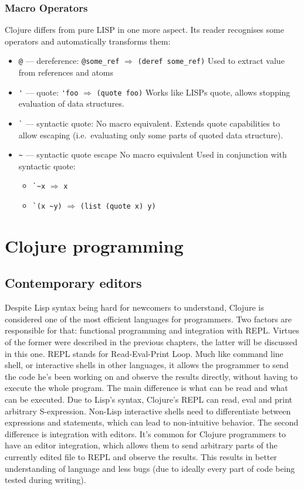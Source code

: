 \documentclass[11pt]{scrartcl}
\begin{document}
\subsubsection{Macro Operators}
Clojure differs from pure LISP in one more aspect.
Its reader recognises some operators and automatically transforms them:
\begin{itemize}
  \item \lstinline|@| --- dereference:
\lstinline|@some_ref| $\Rightarrow$ \lstinline|(deref some_ref)|
Used to extract value from references and atoms
  \item \lstinline|'| --- quote:
\lstinline|'foo| $\Rightarrow$ \lstinline|(quote foo)|
Works like LISPs quote, allows stopping evaluation of data structures.
  \item \lstinline|`| --- syntactic quote:
No macro equivalent.
Extends quote capabilities to allow escaping (i.e.\ evaluating only some parts of
quoted data structure).

  \item \lstinline|~| --- syntactic quote escape
No macro equivalent
Used in conjunction with syntactic quote:
\begin{itemize}
  \item \lstinline|`~x| $\Rightarrow$ \lstinline|x|
  \item \lstinline|`(x ~y)|
  $\Rightarrow$ \texttt{(list (quote x) y)}
\end{itemize}
\end{itemize}

\section{Clojure programming}
\subsection{Contemporary editors}
Despite Lisp syntax being hard for newcomers to understand, Clojure is
considered one of the most efficient languages for programmers.
Two factors are responsible for that: functional programming and integration
with REPL.\@
Virtues of the former were described in the previous chapters, the latter will
be discussed in this one.
REPL stands for Read-Eval-Print Loop.
Much like command line shell, or interactive shells in other languages, it
allows the programmer to send the code he’s been working on and observe the
results directly, without having to execute the whole program.
The main difference is what can be read and what can be executed.
Due to Lisp’s syntax, Clojure’s REPL can read, eval and print arbitrary
S-expression.
Non-Lisp interactive shells need to differentiate between expressions and
statements, which can lead to non-intuitive behavior.
The second difference is integration with editors.
It’s common for Clojure programmers to have an editor integration, which allows
them to send arbitrary parts of the currently edited file to REPL and observe
the results.
This results in better understanding of language and less bugs (due to ideally
every part of code being tested during writing).
\end{document}
